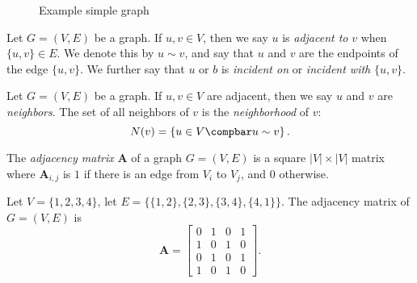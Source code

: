 \documentclass[12pt]{article}
\begin{document}
\begin{figure}[ht!]
    \centering
\caption{Example simple graph}
\label{fig:example-graph}
\end{figure}

\begin{defn}
    Let $G = (V, E)$ be a graph. If $u, v \in V$, then we say $u$ is \emph{adjacent to} $v$ when $\{u, v\} \in E$. We denote this by $u \sim v$, and say that $u$ and $v$ are the endpoints of the edge $\{u, v\}$. We further say that $u$ or $b$ is \emph{incident on} or \emph{incident with} $\{u, v\}$.
\end{defn}

\begin{defn}
    Let $G = (V, E)$ be a graph. If $u, v \in V$ are adjacent, then we say $u$ and $v$ are \emph{neighbors}. The set of all neighbors of $v$ is the \emph{neighborhood} of $v$:
    \[N(v) = \left\{u \in V \compbar u \sim v \right\}.\]
\end{defn}

\begin{defn}
    The \emph{adjacency matrix} $\bm{A}$ of a graph $G = (V, E)$ is a square $|V| \times |V|$ matrix where $\bm{A}_{i, j}$ is $1$ if there is an edge from $V_i$ to $V_j$, and $0$ otherwise.
\end{defn}

\begin{exmp}
    Let $V = \{1, 2, 3, 4\}$, let $E = \{\{1, 2\}, \{2, 3\}, \{3, 4\}, \{4, 1\}\}$. The adjacency matrix of $G = (V, E)$ is
    \[\bm{A} = \begin{bmatrix}
        0 & 1 & 0 & 1 \\
        1 & 0 & 1 & 0 \\
        0 & 1 & 0 & 1 \\
        1 & 0 & 1 & 0
    \end{bmatrix}.\]
\end{exmp}
\end{document}
